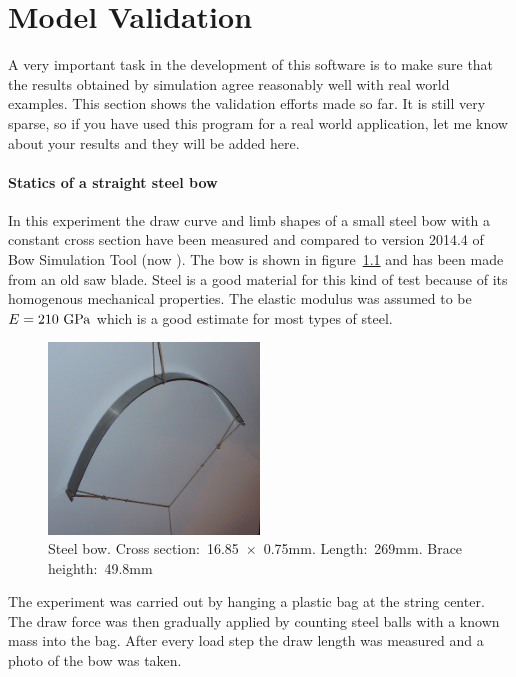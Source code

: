 \chapter{Model Validation} 

A very important task in the development of this software is to make sure that the results obtained by simulation agree reasonably well with real world examples.
This section shows the validation efforts made so far.
It is still very sparse, so if you have used this program for a real world application, let me know about your results and they will be added here.
\subsubsection{Statics of a straight steel bow}

In this experiment the draw curve and limb shapes of a small steel bow with a constant cross section have been measured and compared to version 2014.4 of Bow Simulation Tool (now \swtitle).
The bow is shown in figure~\ref{fig:validation:setup} and has been made from an old saw blade.
Steel is a good material for this kind of test because of its homogenous mechanical properties.
The elastic modulus was assumed to be $E = 210\ \rm{GPa}$ which is a good estimate for most types of steel.

\begin{figure}[H]
\centering
\includegraphics[width=0.5\textwidth]{figures/validation/setup.png}
\caption{Steel bow. Cross section:~16.85~$\times$~0.75mm. Length:~269mm. Brace heighth:~49.8mm}
\label{fig:validation:setup}
\end{figure}

The experiment was carried out by hanging a plastic bag at the string center.
The draw force was then gradually applied by counting steel balls with a known mass into the bag.
After every load step the draw length was measured and a photo of the bow was taken.

